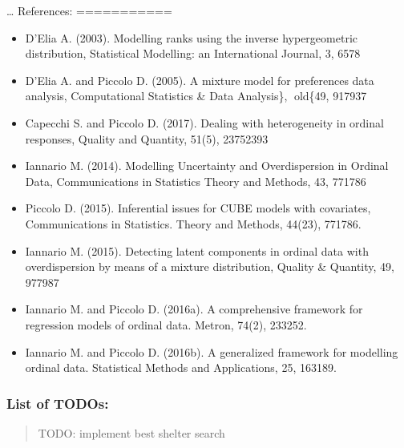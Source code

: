 \documentclass[letterpaper,10pt,english]{sphinxmanual}
\begin{document}
\sphinxAtStartPar
…
References:
===========
\begin{itemize}
\item {} 
\sphinxAtStartPar
D’Elia A. (2003). Modelling ranks using the inverse hypergeometric distribution, Statistical Modelling: an International Journal, 3, 65\textendash{}78

\item {} 
\sphinxAtStartPar
D’Elia A. and Piccolo D. (2005). A mixture model for preferences data analysis, Computational Statistics \& Data Analysis\},  old\{49, 917\textendash{}937

\item {} 
\sphinxAtStartPar
Capecchi S. and Piccolo D. (2017). Dealing with heterogeneity in ordinal responses, Quality and Quantity, 51(5), 2375\textendash{}2393

\item {} 
\sphinxAtStartPar
Iannario M. (2014). Modelling Uncertainty and Overdispersion in Ordinal Data, Communications in Statistics \sphinxhyphen{} Theory and Methods, 43, 771\textendash{}786

\item {} 
\sphinxAtStartPar
Piccolo D. (2015). Inferential issues for CUBE models with covariates, Communications in Statistics. Theory and Methods, 44(23), 771\textendash{}786.

\item {} 
\sphinxAtStartPar
Iannario M. (2015). Detecting latent components in ordinal data with overdispersion by means of a mixture distribution, Quality \& Quantity, 49, 977\textendash{}987

\item {} 
\sphinxAtStartPar
Iannario M. and Piccolo D. (2016a). A comprehensive framework for regression models of ordinal data. Metron, 74(2), 233\textendash{}252.

\item {} 
\sphinxAtStartPar
Iannario M. and Piccolo D. (2016b). A generalized framework for modelling ordinal data. Statistical Methods and Applications, 25, 163\textendash{}189.

\end{itemize}


\subsubsection{List of TODOs:}
\label{\detokenize{cubmods:id244}}\begin{quote}

\sphinxAtStartPar
TODO: implement best shelter search
\end{quote}
\end{document}
